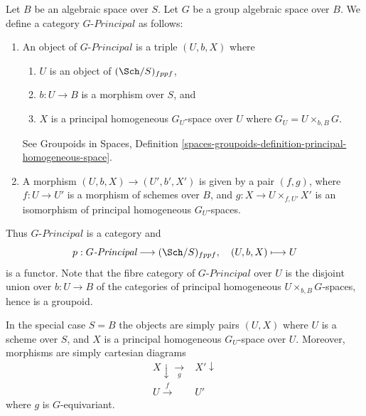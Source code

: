 Let $B$ be an algebraic space over $S$.
Let $G$ be a group algebraic space over $B$.
We define a category $G\textit{-Principal}$ as follows:
\begin{enumerate}
\item An object of $G\textit{-Principal}$ is a triple $(U, b, X)$ where
\begin{enumerate}
\item $U$ is an object of $(\Sch/S)_{fppf}$,
\item $b : U \to B$ is a morphism over $S$, and
\item $X$ is a principal homogeneous $G_U$-space over $U$ where
$G_U = U \times_{b, B} G$.
\end{enumerate}
See
Groupoids in Spaces,
Definition \ref{spaces-groupoids-definition-principal-homogeneous-space}.
\item A morphism $(U, b, X) \to (U', b', X')$ is given
by a pair $(f, g)$, where $f : U \to U'$ is a morphism of schemes
over $B$, and $g : X \to U \times_{f, U'} X'$ is an
isomorphism of principal homogeneous $G_U$-spaces.
\end{enumerate}
Thus $G\textit{-Principal}$ is a category and
$$
p : G\textit{-Principal} \longrightarrow (\Sch/S)_{fppf},
\quad
(U, b, X) \longmapsto U
$$
is a functor. Note that the fibre category of $G\textit{-Principal}$
over $U$ is the disjoint union over $b : U \to B$
of the categories of principal homogeneous $U \times_{b, B} G$-spaces,
hence is a groupoid.

\medskip\noindent
In the special case $S = B$ the objects are simply pairs
$(U, X)$ where $U$ is a scheme over $S$, and $X$ is a principal homogeneous
$G_U$-space over $U$. Moreover, morphisms are simply cartesian
diagrams
$$
\begin{array}{cc}X \downarrow\underset{g}{\longrightarrow} & X' \downarrow \\ U \overset{f}{\longrightarrow} & U'\end{array}
$$
where $g$ is $G$-equivariant.

